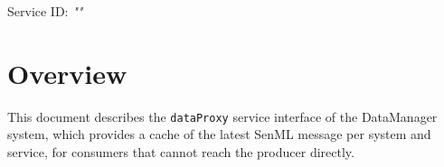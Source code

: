 \documentclass[a4paper]{arrowhead}
\begin{document}
\sloppy

\ArrowheadSetup

\begin{center}
  \vspace*{1cm}
  \huge{\arrowtitle}

  \vspace*{0.2cm}
  \LARGE{\arrowtype}
  \vspace*{1cm}

  \Large{Service ID: \textit{"\arrowid"}}

  \vspace*{\fill}


  \vspace*{1cm}
  \vspace*{\fill}

  \begin{abstract}
    This document describes the HTTP/1.1 protocol with TLS payload security and JSON payload encoding variant of the \texttt{dataProxy} service of the DataManager system.
  \end{abstract}

  \vspace*{1cm}
\end{center}

\newpage

\tableofcontents
\newpage

\section{Overview}
\label{sec:overview}

This document describes the \texttt{dataProxy} service interface of the DataManager system, which provides a cache of the latest SenML message per system and service, for consumers that cannot reach the producer directly.
\end{document}
